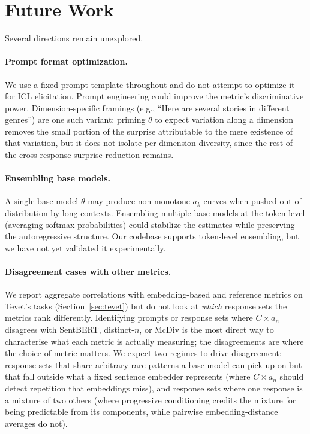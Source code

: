 \section{Future Work}

Several directions remain unexplored.

\paragraph{Prompt format optimization.} We use a fixed prompt template throughout and do not attempt to optimize it for ICL elicitation.
Prompt engineering could improve the metric's discriminative power.
Dimension-specific framings (e.g., ``Here are several stories in different genres'') are one such variant: priming $\theta$ to expect variation along a dimension removes the small portion of the surprise attributable to the mere existence of that variation, but it does not isolate per-dimension diversity, since the rest of the cross-response surprise reduction remains.

\paragraph{Ensembling base models.} A single base model $\theta$ may produce non-monotone $a_k$ curves when pushed out of distribution by long contexts.
Ensembling multiple base models at the token level (averaging softmax probabilities) could stabilize the estimates while preserving the autoregressive structure.
Our codebase supports token-level ensembling, but we have not yet validated it experimentally.

\paragraph{Disagreement cases with other metrics.}
We report aggregate correlations with embedding-based and reference metrics on Tevet's tasks (Section~\ref{sec:tevet}) but do not look at \emph{which} response sets the metrics rank differently.
Identifying prompts or response sets where $C \times a_n$ disagrees with SentBERT, distinct-$n$, or McDiv is the most direct way to characterise what each metric is actually measuring; the disagreements are where the choice of metric matters.
We expect two regimes to drive disagreement: response sets that share arbitrary rare patterns a base model can pick up on but that fall outside what a fixed sentence embedder represents (where $C \times a_n$ should detect repetition that embeddings miss), and response sets where one response is a mixture of two others (where progressive conditioning credits the mixture for being predictable from its components, while pairwise embedding-distance averages do not).


